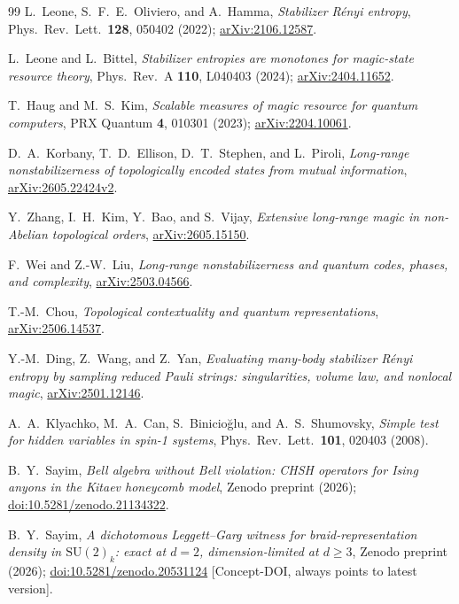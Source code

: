 \documentclass[aps,pra,twocolumn,superscriptaddress,longbibliography,floatfix,nofootinbib]{revtex4-2}
\begin{document}
\begin{thebibliography}{99}
L.~Leone, S.~F.~E.~Oliviero, and A.~Hamma,
\emph{Stabilizer Rényi entropy},
Phys.\ Rev.\ Lett.\ \textbf{128}, 050402 (2022);
\href{https://arxiv.org/abs/2106.12587}{arXiv:2106.12587}.

L.~Leone and L.~Bittel,
\emph{Stabilizer entropies are monotones for magic-state resource
theory},
Phys.\ Rev.\ A \textbf{110}, L040403 (2024);
\href{https://arxiv.org/abs/2404.11652}{arXiv:2404.11652}.

T.~Haug and M.~S.~Kim,
\emph{Scalable measures of magic resource for quantum computers},
PRX Quantum \textbf{4}, 010301 (2023);
\href{https://arxiv.org/abs/2204.10061}{arXiv:2204.10061}.

D.~A.~Korbany, T.~D.~Ellison, D.~T.~Stephen, and L.~Piroli,
\emph{Long-range nonstabilizerness of topologically encoded states
from mutual information},
\href{https://arxiv.org/abs/2605.22424v2}{arXiv:2605.22424v2}.

Y.~Zhang, I.~H.~Kim, Y.~Bao, and S.~Vijay,
\emph{Extensive long-range magic in non-Abelian topological orders},
\href{https://arxiv.org/abs/2605.15150}{arXiv:2605.15150}.

F.~Wei and Z.-W.~Liu,
\emph{Long-range nonstabilizerness and quantum codes, phases, and
complexity},
\href{https://arxiv.org/abs/2503.04566}{arXiv:2503.04566}.

T.-M.~Chou,
\emph{Topological contextuality and quantum representations},
\href{https://arxiv.org/abs/2506.14537}{arXiv:2506.14537}.

Y.-M.~Ding, Z.~Wang, and Z.~Yan,
\emph{Evaluating many-body stabilizer Rényi entropy by sampling
reduced Pauli strings: singularities, volume law, and nonlocal magic},
\href{https://arxiv.org/abs/2501.12146}{arXiv:2501.12146}.

A.~A.~Klyachko, M.~A.~Can, S.~Binicio\u{g}lu, and A.~S.~Shumovsky,
\emph{Simple test for hidden variables in spin-1 systems},
Phys.\ Rev.\ Lett.\ \textbf{101}, 020403 (2008).

B.~Y.~Sayim,
\emph{Bell algebra without Bell violation: CHSH operators for Ising
anyons in the Kitaev honeycomb model},
Zenodo preprint (2026);
\href{https://doi.org/10.5281/zenodo.21134322}{doi:10.5281/zenodo.21134322}.

B.~Y.~Sayim,
\emph{A dichotomous Leggett--Garg witness for braid-representation
density in $\mathrm{SU}(2)_k$: exact at $d=2$, dimension-limited at
$d\ge3$},
Zenodo preprint (2026);
\href{https://doi.org/10.5281/zenodo.20531124}{doi:10.5281/zenodo.20531124}
[Concept-DOI, always points to latest version].


\end{thebibliography}
\end{document}
